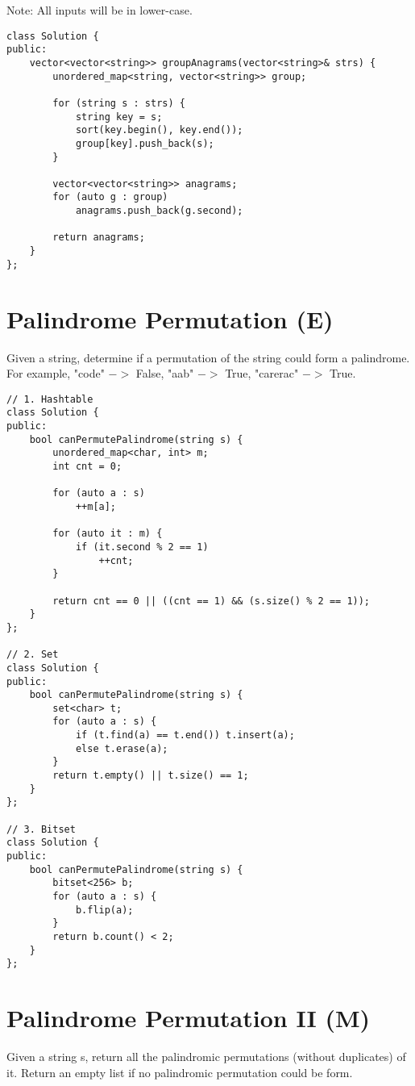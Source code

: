 Note: All inputs will be in lower-case.\\

\begin{lstlisting}
class Solution {
public:
    vector<vector<string>> groupAnagrams(vector<string>& strs) {
        unordered_map<string, vector<string>> group;

        for (string s : strs) {
            string key = s; 
            sort(key.begin(), key.end());
            group[key].push_back(s);
        }
        
        vector<vector<string>> anagrams;
        for (auto g : group)
            anagrams.push_back(g.second);
        
        return anagrams;
    }
};
\end{lstlisting}


\section{Palindrome Permutation (E)}
Given a string, determine if a permutation of the string could form a palindrome.\\

For example, "code" $->$ False, "aab" $->$ True, "carerac" $->$ True.\\

\begin{lstlisting}
// 1. Hashtable
class Solution {
public:
    bool canPermutePalindrome(string s) {
        unordered_map<char, int> m;
        int cnt = 0;
        
        for (auto a : s)
            ++m[a];
            
        for (auto it : m) {
            if (it.second % 2 == 1)
                ++cnt;
        }
        
        return cnt == 0 || ((cnt == 1) && (s.size() % 2 == 1));
    }
};

// 2. Set
class Solution {
public:
    bool canPermutePalindrome(string s) {
        set<char> t;
        for (auto a : s) {
            if (t.find(a) == t.end()) t.insert(a);
            else t.erase(a);
        }
        return t.empty() || t.size() == 1;
    }
};

// 3. Bitset
class Solution {
public:
    bool canPermutePalindrome(string s) {
        bitset<256> b;
        for (auto a : s) {
            b.flip(a);
        }
        return b.count() < 2;
    }
};
\end{lstlisting}


\section{Palindrome Permutation II (M)}
Given a string s, return all the palindromic permutations (without duplicates) of it. Return an empty list if no palindromic permutation could be form.\\

